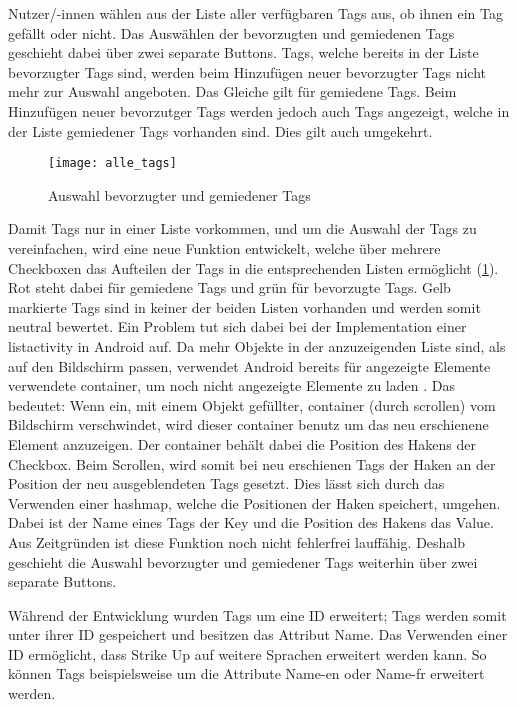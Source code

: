 Nutzer/-innen wählen aus der Liste aller verfügbaren Tags aus, ob ihnen ein Tag gefällt oder nicht. Das Auswählen der bevorzugten und gemiedenen Tags geschieht dabei über zwei separate
Buttons. \newline
Tags, welche bereits in der Liste bevorzugter Tags sind, werden beim Hinzufügen neuer bevorzugter Tags nicht mehr zur Auswahl angeboten. Das Gleiche gilt für gemiedene Tags. Beim Hinzufügen
neuer bevorzutger Tags werden jedoch auch Tags angezeigt, welche in der Liste gemiedener Tags vorhanden sind. Dies gilt auch umgekehrt. \newline
\begin{figure}[htpb]
    \centering
    \texttt{[image: alle\_tags]}
    \caption{Auswahl bevorzugter und gemiedener Tags}
    \label{img:alle_tags}
\end{figure}
Damit Tags nur in einer Liste vorkommen, und um die Auswahl der Tags zu vereinfachen, wird eine neue Funktion entwickelt, welche über mehrere Checkboxen das Aufteilen der Tags in die
entsprechenden Listen ermöglicht (\ref{img:alle_tags}). Rot steht dabei für gemiedene Tags und grün für bevorzugte Tags. Gelb markierte Tags sind in keiner der beiden Listen vorhanden und werden somit neutral bewertet. \newline
Ein Problem tut sich dabei bei der Implementation einer \gls{listactivity} in Android auf. Da mehr Objekte in der anzuzeigenden Liste sind, als auf den Bildschirm passen, verwendet Android
bereits für angezeigte Elemente verwendete \gls{container}, um noch nicht angezeigte Elemente zu laden \cite{misc:android_listview}. Das bedeutet: Wenn ein, mit einem Objekt gefüllter,
\gls{container} (durch scrollen) vom Bildschirm verschwindet, wird dieser \gls{container} benutz um das neu erschienene Element anzuzeigen. Der \gls{container} behält dabei die
Position des Hakens der Checkbox. Beim Scrollen, wird somit bei neu erschienen Tags der Haken an der Position der neu ausgeblendeten Tags gesetzt. Dies lässt sich durch das Verwenden
einer \gls{hashmap}, welche die Positionen der Haken speichert, umgehen. Dabei ist der Name eines Tags der \glqq{}Key\grqq{} und die Position des Hakens das \glqq{}Value\grqq{}. \newline
Aus Zeitgründen ist diese Funktion noch nicht fehlerfrei lauffähig. Deshalb geschieht die Auswahl bevorzugter und gemiedener Tags weiterhin über zwei separate Buttons.

Während der Entwicklung wurden Tags um eine ID erweitert; Tags werden somit unter ihrer ID gespeichert und besitzen das Attribut \glqq{}Name\grqq{}. \newline
Das Verwenden einer ID ermöglicht, dass Strike Up auf weitere Sprachen erweitert werden kann. So können Tags beispielsweise um die Attribute \glqq{}Name-en\grqq{} oder \glqq{}Name-fr\grqq{} erweitert
werden.

